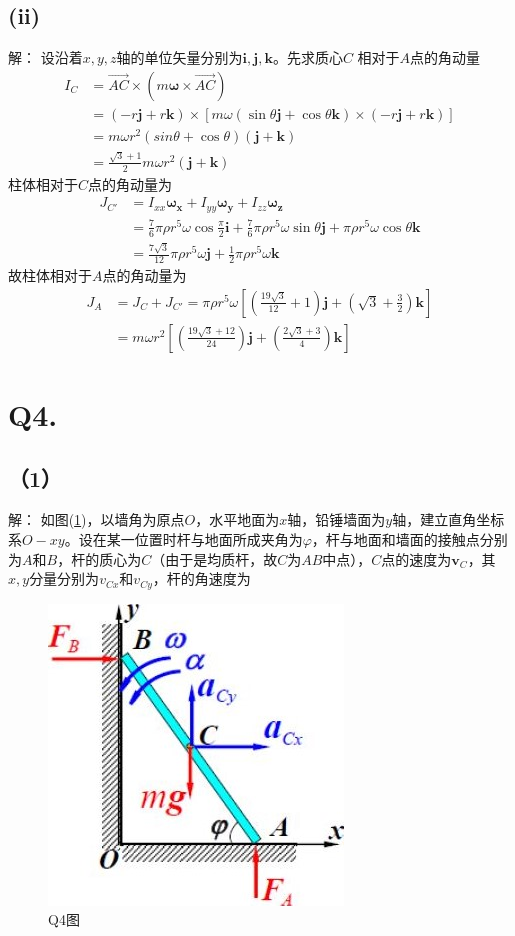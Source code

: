 \documentclass[10pt,a4paper]{article}
\theoremstyle{remark}
\begin{document}
\subsection*{(ii)}解：
设沿着$x,y,z$轴的单位矢量分别为$\bm{i},\bm{j},\bm{k}$。先求质心$C$ 相对于$A$点的角动量
\begin{align*}
I_C &= \overrightarrow{AC}\times(m\bm{\omega}\times\overrightarrow{AC})\\
&= (-r\bm{j} + r\bm{k})\times[m\omega(\sin\theta\bm{j} + \cos\theta\bm{k})\times(-r\bm{j} + r\bm{k})]\\
&= m\omega r^2(sin\theta + \cos\theta)(\bm{j} + \bm{k})\\
&= \frac{\sqrt{3} + 1}{2}m\omega r^2(\bm{j} + \bm{k})
\end{align*}
柱体相对于$C$点的角动量为
\begin{align*}
J_{C'} &= I_{xx}\bm{\omega_{x}} + I_{yy}\bm{\omega_{y}} + I_{zz}\bm{\omega_{z}}\\
&= \frac{7}{6}\pi\rho r^5\omega\cos\frac{\pi}{2}\bm{i} + \frac{7}{6}\pi\rho r^5\omega\sin\theta\bm{j} + \pi\rho r^5\omega\cos\theta\bm{k}\\
&= \frac{7\sqrt{3}}{12}\pi\rho r^5\omega\bm{j} + \frac{1}{2}\pi\rho r^5\omega\bm{k}
\end{align*}
故柱体相对于$A$点的角动量为
\begin{align*}
J_A &= J_C + J_{C'} = \pi\rho r^5\omega[(\frac{19\sqrt{3}}{12} + 1)\bm{j} + (\sqrt{3} + \frac{3}{2})\bm{k}]\\
&= m\omega r^2[(\frac{19\sqrt{3} + 12}{24})\bm{j} + (\frac{2\sqrt{3} + 3}{4})\bm{k}]
\end{align*}
\section*{Q4.}
\subsection*{（1）}解：
如图(\ref{FigureofHomework_2Problem_4})，以墙角为原点$O$，水平地面为$x$轴，铅锤墙面为$y$轴，建立直角坐标系$O-xy$。设在某一位置时杆与地面所成夹角为$\varphi$，杆与地面和墙面的接触点分别为$A$和$B$，杆的质心为$C$（由于是均质杆，故$C$为$AB$中点），$C$点的速度为$\bm{v}_C$，其$x,y$分量分别为$v_{Cx}$和$v_{Cy}$，杆的角速度为
\begin{figure}[h]
\centering
\includegraphics[scale=.6]{FigureofHomework_2Problem_4.jpg}
\caption{Q4图}\label{FigureofHomework_2Problem_4}
\end{figure}
\end{document}
